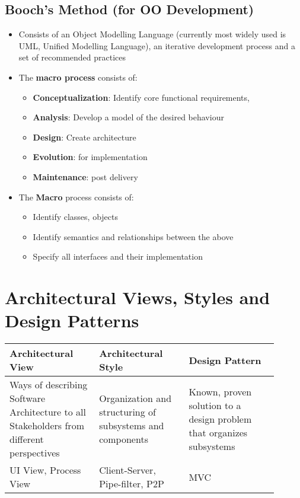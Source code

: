 \documentclass{article}
\begin{document}
\subsection{Booch's Method (for OO Development)}
\begin{itemize}
    \item Consists of an Object Modelling Language (currently most widely used is UML, Unified Modelling Language), an iterative development process and a set of recommended practices
    
    \item The \textbf{macro process} consists of:
    \begin{itemize}
        \item \textbf{Conceptualization}: Identify core functional requirements, 
        
        \item \textbf{Analysis}: Develop a model of the desired behaviour
        
        \item \textbf{Design}: Create architecture
        
        \item \textbf{Evolution}: for implementation
        
        \item \textbf{Maintenance}: post delivery
    \end{itemize}
    
    \item The \textbf{Macro} process consists of:
    \begin{itemize}
        \item Identify classes, objects
        
        \item Identify semantics and relationships between the above
        
        \item Specify all interfaces and their implementation
    \end{itemize}
\end{itemize}

\section{Architectural Views, Styles and Design Patterns}
\begin{tabular}{|p{0.3\linewidth}|p{0.3\linewidth}|p{0.3\linewidth}|}
    \hline
    \textbf{Architectural View} & \textbf{Architectural Style} & \textbf{Design Pattern}  \\
    \hline
    Ways of describing Software Architecture to all Stakeholders from different perspectives & Organization and structuring of subsystems and components & Known, proven solution to a design problem that organizes subsystems \\
    \hline
    UI View, Process View & Client-Server, Pipe-filter, P2P & MVC \\
    \hline
\end{tabular}
\end{document}
